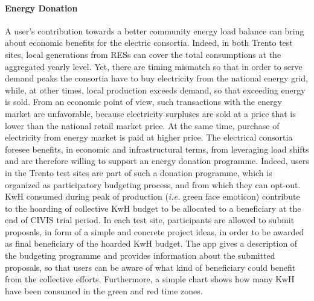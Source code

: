 \paragraph{Energy Donation}
A user's contribution towards a better community energy load balance can bring about economic benefits for the electric consortia. Indeed, in both Trento test sites, local generations from RESs can cover the total consumptions at the aggregated yearly level. Yet, there are timing mismatch so that in order to serve demand peaks the consortia have to buy electricity from the national energy grid, while, at other times, local production exceeds demand, so that exceeding energy is sold. From an economic point of view, such transactions with the energy market are unfavorable, because
electricity surpluses are sold at a price that is lower than the national retail market price. At the same time, purchase of electricity from energy market is paid at higher price.
% 
The electrical consortia foresee benefits, in economic and infrastructural terms, from leveraging load shifts and are therefore willing to support an energy donation programme. 
Indeed, users in the Trento test sites are part of such a donation programme, which is organized as participatory budgeting process, and from which they can opt-out. KwH consumed during peak of
production (\textit{i.e.} green face emoticon) contribute to the hoarding of collective KwH budget to be allocated to a beneficiary at the end of CIVIS trial period.
In each test site, participants are allowed to submit proposals, in form of a simple and concrete project ideas, in order to be awarded as final beneficiary of the hoarded KwH budget.
The app gives a description of the budgeting programme and provides information about the submitted proposals, so that users can be aware of what kind of beneficiary could benefit from the collective efforts. Furthermore, a simple chart shows how many KwH have been consumed in the green and red time zones.



